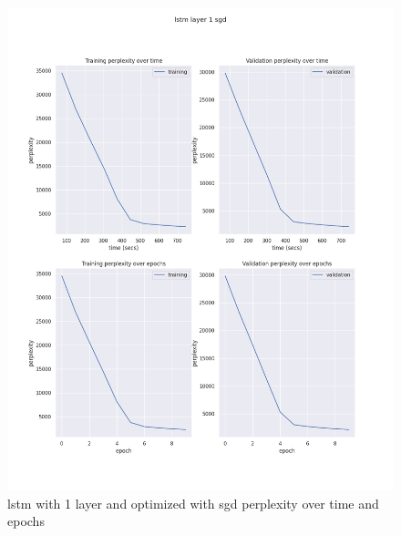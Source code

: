 \documentclass[12pt]{article}
\theoremstyle{definition}
\begin{document}
\begin{figure}[H]
     \centering
     \includegraphics[scale=0.4]{lstm_layer_1_sgd.png}
     \caption{lstm with 1 layer and optimized with sgd perplexity over time and epochs}
\end{figure}
\end{document}
